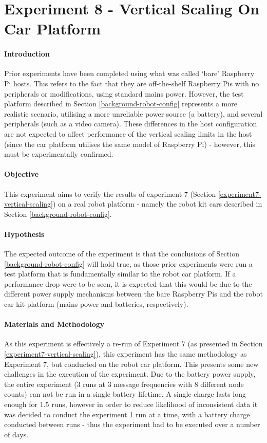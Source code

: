 \documentclass[../dissertation.tex]{subfiles}
\begin{document}
\section{Experiment 8 - Vertical Scaling On Car Platform}
\label{experiment8-vertical-scaling}

\paragraph{Introduction} Prior experiments have been completed using what was called `bare' Raspberry Pi hosts. This refers to the fact that they are off-the-shelf Raspberry Pis with no peripherals or modifications, using standard mains power. However, the test platform described in Section \ref{background-robot-config} represents a more realistic scenario, utilising a more unreliable power source (a battery), and several peripherals (such as a video camera). These differences in the host configuration are not expected to affect performance of the vertical scaling limits in the host (since the car platform utilises the same model of Raspberry Pi) - however, this must be experimentally confirmed.

\paragraph{Objective} This experiment aims to verify the results of experiment 7 (Section \ref{experiment7-vertical-scaling}) on a real robot platform - namely the robot kit cars described in Section \ref{background-robot-config}.

\paragraph{Hypothesis} The expected outcome of the experiment is that the conclusions of Section \ref{background-robot-config} will hold true, as those prior experiments were run a test platform that is fundamentally similar to the robot car platform. If a performance drop were to be seen, it is expected that this would be due to the different power supply mechanisms between the bare Raspberry Pis and the robot car kit platform (mains power and batteries, respectively).

\paragraph{Materials and Methodology} As this experiment is effectively a re-run of Experiment 7 (as presented in Section \ref{experiment7-vertical-scaling}), this experiment has the same methodology as Experiment 7, but conducted on the robot car platform. This presents some new challenges in the execution of the experiment. Due to the battery power supply, the entire experiment (3 runs at 3 message frequencies with 8 different node counts) can not be run in a single battery lifetime. A single charge lasts long enough for 1.5 runs, however in order to reduce likelihood of inconsistent data it was decided to conduct the experiment 1 run at a time, with a battery charge conducted between runs - thus the experiment had to be executed over a number of days.
\end{document}
